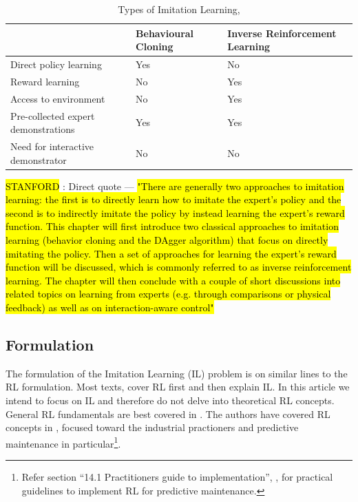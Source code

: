 \documentclass{article}
\newcommand{\hlc}[2][blue!10]{{\colorlet{foo}{#1} \sethlcolor{foo}\hl{#2}}}
\begin{document}
	
	\begingroup
	\setlength{\tabcolsep}{6pt}
	\begin{table}[h!]
		\centering
		\renewcommand{\arraystretch}{1.5} 
		\begin{tabular}{L{6cm} L{3cm} L{3cm}}
			\midrule[0.01pt]
			& \textbf{Behavioural Cloning} & \textbf{Inverse Reinforcement Learning}\\
			\midrule[0.01pt]
			Direct policy learning & Yes & No \\
			Reward learning & No & Yes \\
			Access to environment & No & Yes \\
			Pre-collected expert demonstrations & Yes & Yes \\
			Need for interactive demonstrator & No & No \\
			\midrule[0.01pt]
		\end{tabular}
		\caption{Types of Imitation Learning, \cite{yue2018imitation}}
		\label{tbl:BC_IRL}
	\end{table}
	\endgroup
	
	\hlc{STANFORD} : Direct quote --- \hlc{"There are generally two approaches to imitation learning: the first is to directly
		learn how to imitate the expert’s policy and the second is to indirectly
		imitate the policy by instead learning the expert’s reward function. This chapter
		will first introduce two classical approaches to imitation learning (behavior
		cloning and the DAgger algorithm) that focus on directly imitating the policy.
		Then a set of approaches for learning the expert’s reward function will be discussed,
		which is commonly referred to as inverse reinforcement learning. The
		chapter will then conclude with a couple of short discussions into related topics
		on learning from experts (e.g. through comparisons or physical feedback) as
		well as on interaction-aware control"}
	
	\subsection{Formulation} %
	
	The formulation of the Imitation Learning (IL) problem is on similar lines to the RL formulation. Most texts, cover RL first and then explain IL. In this article we intend to focus on IL and therefore do not delve into theoretical RL concepts. General RL fundamentals are best covered in \citep{sutton2018, stanford-lectures}. The authors have covered RL concepts in \cite{siraskar2023}, focused toward the industrial practioners and predictive maintenance in particular\footnote{Refer section ``14.1 Practitioners guide to implementation'', \citep{siraskar2023}, for practical guidelines to implement RL for predictive maintenance.}.  
	
\end{document}
